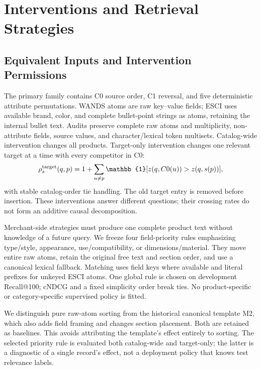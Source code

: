 \section{Interventions and Retrieval Strategies}
\subsection{Equivalent Inputs and Intervention Permissions}
The primary family contains C0 source order, C1 reversal, and five deterministic attribute permutations. WANDS atoms are raw key--value fields; ESCI uses available brand, color, and complete bullet-point strings as atoms, retaining the internal bullet text. Audits preserve complete raw atoms and multiplicity, non-attribute fields, source values, and character/lexical token multisets. Catalog-wide intervention changes all products. Target-only intervention changes one relevant target at a time with every competitor in C0:
\begin{equation}
\rho_s^{\rm target}(q,p)=1+\sum_{u\ne p}\mathbb{1}[z(q,C0(u))>z(q,s(p))],
\end{equation}
with stable catalog-order tie handling. The old target entry is removed before insertion. These interventions answer different questions; their crossing rates do not form an additive causal decomposition.

Merchant-side strategies must produce one complete product text without knowledge of a future query. We freeze four field-priority rules emphasizing type/style, appearance, use/compatibility, or dimensions/material. They move entire raw atoms, retain the original free text and section order, and use a canonical lexical fallback. Matching uses field keys where available and literal prefixes for unkeyed ESCI atoms. One global rule is chosen on development Recall@100; cNDCG and a fixed simplicity order break ties. No product-specific or category-specific supervised policy is fitted.

We distinguish pure raw-atom sorting from the historical canonical template M2, which also adds field framing and changes section placement. Both are retained as baselines. This avoids attributing the template's effect entirely to sorting. The selected priority rule is evaluated both catalog-wide and target-only; the latter is a diagnostic of a single record's effect, not a deployment policy that knows test relevance labels.

